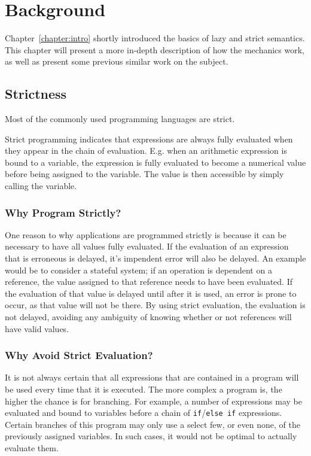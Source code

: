 \chapter{Background}
Chapter~\ref{chapter:intro} shortly introduced the basics of lazy and strict
semantics. This chapter will present a more in-depth description of how the
mechanics work, as well as present some previous similar work on the subject.

\section{Strictness}
Most of the commonly used programming languages are strict.

Strict programming indicates that expressions are always fully evaluated when
they appear in the chain of evaluation. E.g. when an arithmetic expression is
bound to a variable, the expression is fully evaluated to become a numerical
value before being assigned to the variable. The value is then accessible
by simply calling the variable.

\subsection{Why Program Strictly?}
One reason to why applications are programmed strictly is because it can be
necessary to have all values fully evaluated. If the evaluation of an expression
that is erroneous is delayed, it's impendent error will also be delayed.
An example would be to consider a stateful system; if an operation is dependent
on a reference, the value assigned to that reference needs to have been
evaluated. If the evaluation of that value is delayed until after it is used,
an error is prone to occur, as that value will not be there.
By using strict evaluation, the evaluation is not delayed, avoiding any
ambiguity of knowing whether or not references will have valid values.

\subsection{Why Avoid Strict Evaluation?}
It is not always certain that all expressions that are contained in a program
will be used every time that it is executed. The more complex a program is, the
higher the chance is for branching. For example, a number of expressions may
be evaluated and bound to variables before a chain of
\texttt{if}/\texttt{else if} expressions. Certain branches of this program may
only use a select few, or even none, of the previously assigned variables.
In such cases, it would not be optimal to actually evaluate them.

